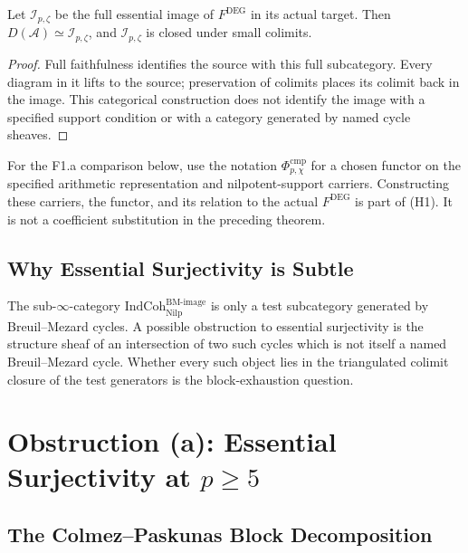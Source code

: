 \begin{proposition}
\label{v4-arith:deg-f1a:prop:deg-image}
Let \(\mathcal I_{p,\zeta}\) be the full essential image of
\(F^{\mathrm{DEG}}\) in its actual target. Then
\(D(\mathcal A)\simeq\mathcal I_{p,\zeta}\), and
\(\mathcal I_{p,\zeta}\) is closed under small colimits.
\end{proposition}
\begin{proof}
Full faithfulness identifies the source with this full subcategory.
Every diagram in it lifts to the source; preservation of colimits
places its colimit back in the image. This categorical construction
does not identify the image with a specified support condition or
with a category generated by named cycle sheaves.
\end{proof}

For the F1.a comparison below, use the notation
\(\Phi^{\mathrm{cmp}}_{p,\chi}\) for a chosen functor on the
specified arithmetic representation and nilpotent-support carriers.
Constructing these carriers, the functor, and its relation to the
actual \(F^{\mathrm{DEG}}\) is part of (H1). It is not a coefficient
substitution in the preceding theorem.

\subsection{Why Essential Surjectivity is Subtle}

\begin{remark}
\label{v4-arith:deg-f1a:rem:deg-fails-surj-intuition}
The sub-\(\infty\)-category
\(\mathrm{IndCoh}_{\mathrm{Nilp}}^{\mathrm{BM\text{-}image}}\) is only
a test subcategory generated by Breuil--Mezard cycles.  A possible
obstruction to essential surjectivity is the structure sheaf of an
intersection of two such cycles which is not itself a named
Breuil--Mezard cycle.  Whether every such object lies in the
triangulated colimit closure of the test generators is the
block-exhaustion question.
\end{remark}

\section{Obstruction (a): Essential Surjectivity at \(p\geq 5\)}
\label{v4-arith:deg-f1a:ess-surj}

\subsection{The Colmez--Paskunas Block Decomposition}

